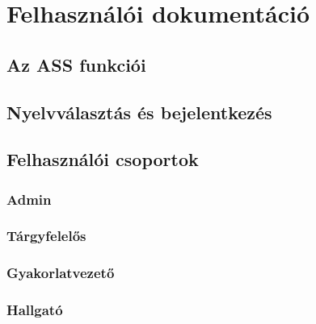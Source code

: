 \chapter{Felhasználói dokumentáció} %
\label{ch:user}

\section{Az ASS funkciói}
\section{Nyelvválasztás és bejelentkezés}
\section{Felhasználói csoportok}
\subsection{Admin}
\subsection{Tárgyfelelős}
\subsection{Gyakorlatvezető}
\subsection{Hallgató}
